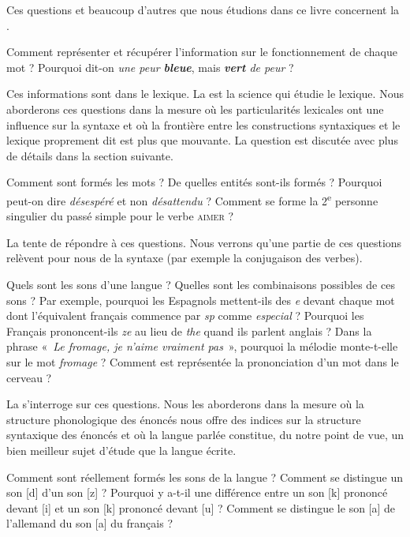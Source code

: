 {    Ces questions et beaucoup d’autres que nous étudions dans ce livre concer\-nent la .

    Comment représenter et récupérer l’information sur le fonctionnement de chaque mot ? Pourquoi dit-on \textit{une peur \textbf{bleue}}, mais \textit{\textbf{vert} de peur} ?

    Ces informations sont dans le lexique. La  est la science qui étudie le lexique. Nous aborderons ces questions dans la mesure où les particularités lexicales ont une influence sur la syntaxe et où la frontière entre les constructions syntaxiques et le lexique proprement dit est plus que mouvante. La question est discutée avec plus de détails dans la section suivante.

    Comment sont formés les mots ? De quelles entités sont-ils formés ? Pourquoi peut-on dire \textit{désespéré} et non \textit{désattendu} ? Comment se forme la 2\textsuperscript{e} personne singulier du passé simple pour le verbe \textsc{aimer} ?

    La  tente de répondre à ces questions. Nous verrons qu’une partie de ces questions relèvent pour nous de la syntaxe (par exemple la conjugaison des verbes).

    Quels sont les sons d’une langue ? Quelles sont les combinaisons possibles de ces sons ? Par exemple, pourquoi les Espagnols mettent-ils des \textit{e} devant chaque mot dont l’équivalent français commence par \textit{sp} comme \textit{especial} ? Pourquoi les Français prononcent-ils \textit{ze} au lieu de \textit{the} quand ils parlent anglais ? Dans la phrase «~\textit{Le fromage, je n’aime vraiment pas}~», pourquoi la mélodie monte-t-elle sur le mot \textit{fromage} ? Comment est représentée la prononciation d’un mot dans le cerveau ?

    La  s’interroge sur ces questions. Nous les aborderons dans la mesure où la structure phonologique des énoncés nous offre des indices sur la structure syntaxique des énoncés et où la langue parlée constitue, du notre point de vue, un bien meilleur sujet d’étude que la langue écrite.

    Comment sont réellement formés les sons de la langue ? Comment se distingue un son [d] d’un son [z] ? Pourquoi y a-t-il une différence entre un son [k] prononcé devant [i] et un son [k] prononcé devant [u] ? Comment se distingue le son [a] de l’allemand du son [a] du français ?

}
